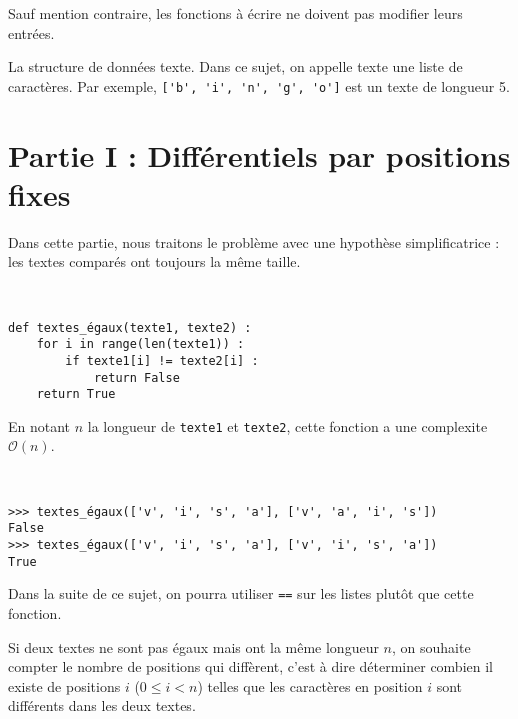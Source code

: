 Sauf mention contraire, les fonctions à écrire ne doivent pas modifier leurs entrées.

La structure de données texte. Dans ce sujet, on appelle texte une liste de caractères. Par
exemple, \lstinline{['b', 'i', 'n', 'g', 'o']} est un texte de longueur 5.


\section*{Partie I : Différentiels par positions fixes}
Dans cette partie, nous traitons le problème avec une hypothèse simplificatrice : les textes
comparés ont toujours la même taille.

\ifprof
\begin{corrige}~\\ 
\vspace{-.5cm}
\begin{lstlisting}
def textes_égaux(texte1, texte2) :
    for i in range(len(texte1)) :
        if texte1[i] != texte2[i] :
            return False
    return True
\end{lstlisting}
En notant $n$ la longueur de \lstinline{texte1} et \lstinline{texte2}, cette fonction a une complexite $\mathcal{O}(n)$.
\end{corrige}
\else
\begin{exemple}~\\ 
\vspace{-.5cm}
\begin{lstlisting}
>>> textes_égaux(['v', 'i', 's', 'a'], ['v', 'a', 'i', 's'])
False
>>> textes_égaux(['v', 'i', 's', 'a'], ['v', 'i', 's', 'a'])
True
\end{lstlisting}
\end{exemple}
\fi



Dans la suite de ce sujet, on pourra utiliser \lstinline{==} sur les listes plutôt que cette fonction.

Si deux textes ne sont pas égaux mais ont la même longueur $n$, on souhaite compter le nombre
de positions qui diffèrent, c'est à dire déterminer combien il existe de positions $i$ ($0\leq i < n$)
telles que les caractères en position $i$ sont différents dans les deux textes.

